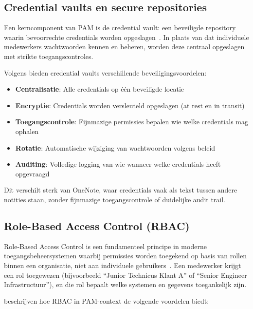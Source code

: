 \subsection{Credential vaults en secure repositories}
\label{subsec:credential-vaults}

Een kerncomponent van PAM is de credential vault: een beveiligde repository waarin bevoorrechte credentials worden opgeslagen~\autocite[pp.~155--161]{garbis2021pam}. 
In plaats van dat individuele medewerkers wachtwoorden kennen en beheren, worden deze centraal opgeslagen met strikte toegangscontroles. 

Volgens \textcite{souppaya2021pam} bieden credential vaults verschillende beveiligingsvoordelen:
\begin{itemize}
    \item \textbf{Centralisatie}: Alle credentials op één beveiligde locatie
    \item \textbf{Encryptie}: Credentials worden versleuteld opgeslagen (at rest en in transit)
    \item \textbf{Toegangscontrole}: Fijnmazige permissies bepalen wie welke credentials mag ophalen
    \item \textbf{Rotatie}: Automatische wijziging van wachtwoorden volgens beleid
    \item \textbf{Auditing}: Volledige logging van wie wanneer welke credentials heeft opgevraagd
\end{itemize}

Dit verschilt sterk van OneNote, waar credentials vaak als tekst tussen andere notities staan, zonder fijnmazige toegangscontrole of duidelijke audit trail.

\subsection{Role-Based Access Control (RBAC)}
\label{subsec:rbac-principe}

Role-Based Access Control is een fundamenteel principe in moderne toegangsbeheersystemen waarbij permissies worden toegekend op basis van rollen binnen een organisatie, niet aan individuele gebruikers~\autocite[pp.~597--623]{blobel2006privilege}. 
Een medewerker krijgt een rol toegewezen (bijvoorbeeld ``Junior Technicus Klant A'' of ``Senior Engineer Infrastructuur''), en die rol bepaalt welke systemen en gegevens toegankelijk zijn.

\textcite[pp.~155--161]{garbis2021pam} beschrijven hoe RBAC in PAM-context de volgende voordelen biedt:

